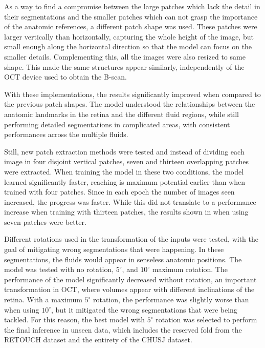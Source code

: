 \par
As a way to find a compromise between the large patches which lack the detail in their segmentations and the smaller patches which can not grasp the importance of the anatomic references, a different patch shape was used. These patches were larger vertically than horizontally, capturing the whole height of the image, but small enough along the horizontal direction so that the model can focus on the smaller details. Complementing this, all the images were also resized to same shape. This made the same structures appear similarly, independently of the OCT device used to obtain the B-scan.
\par
With these implementations, the results significantly improved when compared to the previous patch shapes. The model understood the relationships between the anatomic landmarks in the retina and the different fluid regions, while still performing detailed segmentations in complicated areas, with consistent performances across the multiple fluids.
\par
Still, new patch extraction methods were tested and instead of dividing each image in four disjoint vertical patches, seven and thirteen overlapping patches were extracted. When training the model in these two conditions, the model learned significantly faster, reaching is maximum potential earlier than when trained with four patches. Since in each epoch the number of images seen increased, the progress was faster. While this did not translate to a performance increase when training with thirteen patches, the results shown in when using seven patches were better.
\par
Different rotations used in the transformation of the inputs were tested, with the goal of mitigating wrong segmentations that were happening. In these segmentations, the fluids would appear in senseless anatomic positions. The model was tested with no rotation, $5^{\circ}$, and $10^{\circ}$ maximum rotation. The performance of the model significantly decreased without rotation, an important transformation in OCT, where volumes appear with different inclinations of the retina. With a maximum $5^{\circ}$ rotation, the performance was slightly worse than when using $10^{\circ}$, but it mitigated the wrong segmentations that were being tackled. For this reason, the best model with $5^{\circ}$ rotation was selected to perform the final inference in unseen data, which includes the reserved fold from the RETOUCH dataset and the entirety of the CHUSJ dataset.
\par
